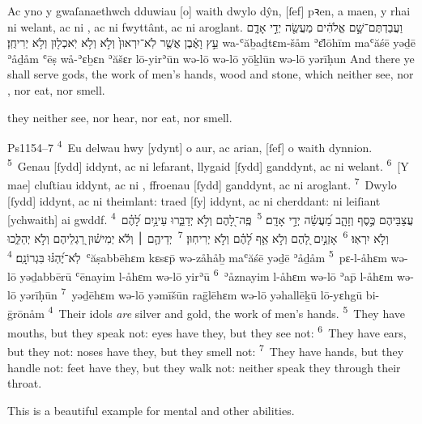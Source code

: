 \begin{example}{5}{4}{28}{}{}
	\quoling
	{Ac yno y gwaſanaethwch dduwiau [o] waith dwylo dŷn, [ſef] pꝛen, a maen, y rhai ni welant, ac ni , ac ni fwyttânt, ac ni aroglant.}
	{וַעֲבַדְתֶּם־שָׁ֣ם אֱלֹהִ֔ים מַעֲשֵׂ֖ה יְדֵ֣י אָדָ֑ם עֵ֣ץ וָאֶ֔בֶן אֲשֶׁ֤ר לֹֽא־יִרְאוּן֙ וְלֹ֣א  וְלֹ֥א יֹֽאכְל֖וּן וְלֹ֥א יְרִיחֻֽן׃}
	{wa-ʿăḇaḏtɛm-šåm ʾɛ̆lōhīm maʿăśē yəḏē ʾåḏåm ʿēṣ wå-ʾɛḇɛn ʾăšɛr lō-yirʾūn wə-lō  wə-lō yōḵlūn wə-lō yərīḥun}
	{And there ye shall serve gods, the work of men's hands, wood and stone, which neither see, nor , nor eat, nor smell.}
\end{example}
\begin{paper}
	 they neither see, nor hear, nor eat, nor smell.
\end{paper}

\begin{example}{Ps}{115}{4–7}{}{}
	\quoling
	{\textsuperscript{4}~Eu delwau hwy [ydynt] o aur, ac arian, [ſef] o waith dynnion.
	\textsuperscript{5}~Genau [ſydd] iddynt, ac ni lefarant, llygaid [ſydd] ganddynt, ac ni welant.
	\textsuperscript{6}~[Y mae] cluſtiau iddynt, ac ni , ffroenau [ſydd] ganddynt, ac ni aroglant.
	\textsuperscript{7}~Dwylo [ſydd] iddynt, ac ni theimlant: traed [ſy] iddynt, ac ni cherddant: ni leiſiant [ychwaith] ai gwddf.}
	{\textsuperscript{4}~עֲצַבֵּיהֶם כֶּ֣סֶף וְזָהָ֑ב מַ֝עֲשֵׂ֗ה יְדֵ֣י אָדָֽם׃
	\textsuperscript{5}~פֶּֽה־לָ֭הֶם וְלֹ֣א יְדַבֵּ֑רוּ עֵינַ֥יִם לָ֝הֶ֗ם וְלֹ֣א יִרְאֽוּ׃
	\textsuperscript{6}~אָזְנַ֣יִם לָ֭הֶם וְלֹ֣א  אַ֥ף לָ֝הֶ֗ם וְלֹ֣א יְרִיחֽוּן׃
	\textsuperscript{7}~יְדֵיהֶ֤ם ׀ וְלֹ֬א יְמִישׁ֗וּן רַ֭גְלֵיהֶם וְלֹ֣א יְהַלֵּ֑כוּ לֹֽא־יֶ֝הְגּ֗וּ בִּגְרוֹנָֽם׃}
	{\textsuperscript{4}~ʿăṣabbēhɛm kɛsɛp̄ wə-zåhåḇ maʿăśē yəḏē ʾåḏåm
	\textsuperscript{5}~pɛ-l-åhɛm wə-lō yəḏabbērū ʿēnayim l-åhɛm wə-lō yirʾū
	\textsuperscript{6}~ʾåznayim l-åhɛm wə-lō  ʾap̄ l-åhɛm wə-lō yərīḥūn
	\textsuperscript{7}~yəḏēhɛm wə-lō yəmīšūn raḡlēhɛm wə-lō yəhallēḵū lō-yɛhgū bi-ḡrōnåm}
	{\textsuperscript{4}~Their idols \emph{are} silver and gold, the work of men's hands.
	\textsuperscript{5}~They have mouths, but they speak not: eyes have they, but they see not:
	\textsuperscript{6}~They have ears, but they  not: noses have they, but they smell not:
	\textsuperscript{7}~They have hands, but they handle not: feet have they, but they walk not: neither speak they through their throat.}
\end{example}
\begin{paper}
	This is a beautiful example for mental and other abilities.
\end{paper}

